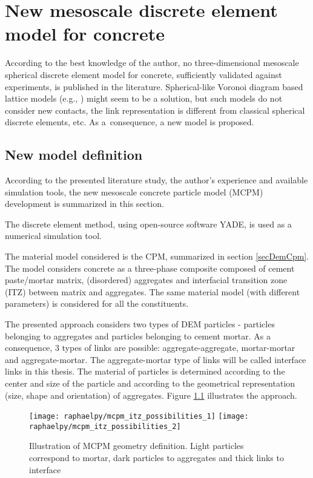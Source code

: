 \chapter{New mesoscale discrete element model for concrete}\label{chapMCPMNewModel}
According to the best knowledge of the author, no three-dimensional mesoscale spherical discrete element model for concrete, sufficiently validated against experiments, is published in the literature.
Spherical-like Voronoi diagram based lattice models (e.g.,
\cite{
	CambordeMariottiDonze2000a,%
	Cusatis2001a,%
	GrasslRempling2008a,%
	IbrahimbegovicDelaplace2003a,%
	WangLinGu2008a,%
	YipLiLiaoBolander2006a%
}) might seem to be a solution, but such models do not consider new contacts, the link representation is different from classical spherical discrete elements, etc.
As a~consequence, a new model is proposed.




\section{New model definition}

According to the presented literature study, the author's experience and available simulation tools, the new mesoscale concrete particle model (MCPM) development is summarized in this section.

The discrete element method, using open-source software YADE, is used as a numerical simulation tool.

The material model considered is the CPM, summarized in section \ref{secDemCpm}.
The model considers concrete as a three-phase composite composed of cement paste/mortar matrix, (disordered) aggregates and interfacial transition zone (ITZ) between matrix and aggregates.
The same material model (with different parameters) is considered for all the constituents.

The presented approach considers two types of DEM particles - particles belonging to aggregates and particles belonging to cement mortar.
As a consequence, 3 types of links are possible: aggregate-aggregate, mortar-mortar and aggregate-mortar.
The aggregate-mortar type of links will be called interface links in this thesis.
The material of particles is determined according to the center and size of the particle and according to the geometrical representation (size, shape and orientation) of aggregates.
Figure \ref{figMCPMItzPossibilities} illustrates the approach.
\begin{figure}[htbp]
	\centering
	\texttt{[image: raphaelpy/mcpm\_itz\_possibilities\_1]}
	\hspace{2em}
	\texttt{[image: raphaelpy/mcpm\_itz\_possibilities\_2]}
	\caption[Illustration of MCPM geometry definition]{Illustration of MCPM geometry definition. Light particles correspond to mortar, dark particles to aggregates and thick links to interface}
	\label{figMCPMItzPossibilities}
\end{figure}

